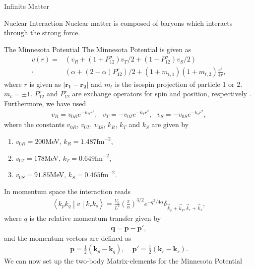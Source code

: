 \documentclass[twoside,english]{uiofysmaster}
\begin{document}
\begin{chapter}{Infinite Matter}
	\begin{section}{Nuclear Interaction}
		Nuclear matter is composed of baryons which interacts through the strong force. 
		
		\begin{subsection}{The Minnesota Potential}
			The Minnesota Potential is given as
			\begin{align}
				v(r) = &\left(v_R + (1 + P_{12}^\sigma) v_T/2 + (1 - P_{12}^\sigma) v_S/2 \right) \\
					   \cdot &\left( \alpha + (2- \alpha)P_{12}^r \right)/2 + (1+m_{t,1})(1+m_{t,2})\frac{e^2}{4r}, \nonumber
			\end{align}
			where $r$ is given as $\left| \mathbf{r_1} - \mathbf{r_2} \right|$ and $m_t$ is the isospin projection of particle 1 or 2. $m_t = \pm 1$. 
			$P_{12}^\sigma $ and $P_{12}^r$ are exchange operators for spin and position, respectively \cite{Baardsen}. Furthermore, we have used
			\begin{align} 
				v_R = v_{0R}e^{-k_R r^2}, \:\:\: v_T = -v_{0T} e^{-k_Tr^2}, \:\:\: v_S = -v_{0S}e^{-k_sr^2},
			\end{align}
			where the constants $v_{0R}$, $v_{0T}$, $v_{0S}$, $k_R$, $k_T$ and $k_S$ are given by \cite{Thompson1977}
			\begin{enumerate}
				\item $v_{0R} = 200$MeV,  $k_R = 1.487 \text{fm}^{-2}$,
				\item $v_{0T} = 178$MeV,  $k_T = 0.649 \text{fm}^{-2}$,
				\item $v_{0S} = 91.85$MeV, $k_S = 0.465 \text{fm}^{-2}$.
			\end{enumerate}
In momentum space the interaction reads
			\begin{align}
			 	\left<k_p k_q \middle| v \middle| k_r k_s \right> = \frac{V_0}{L^3} \left(\frac{\pi}{\alpha}\right)^{3/2} e^{-q^2 / 4 \alpha} \delta_{\vec k_p + \vec k_q, \vec k_r + \vec k_s},
			\end{align}
			where $q$ is the relative momentum transfer given by 
			\begin{align}
				\mathbf{q} = \mathbf{p} - \mathbf{p'},
			\end{align}
			and the momentum vectors are defined as
			\begin{align}
				\mathbf{p} = \frac{1}{2} (\mathbf{k}_p - \mathbf{k}_q), \:\:\:\:\: \mathbf{p'} = \frac{1}{2}(\mathbf{k}_r- \mathbf{k}_s).
			\end{align}
			We can now set up the two-body Matrix-elements for the Minnesota Potential

\end{subsection}
\end{section}
\end{chapter}
\end{document}
